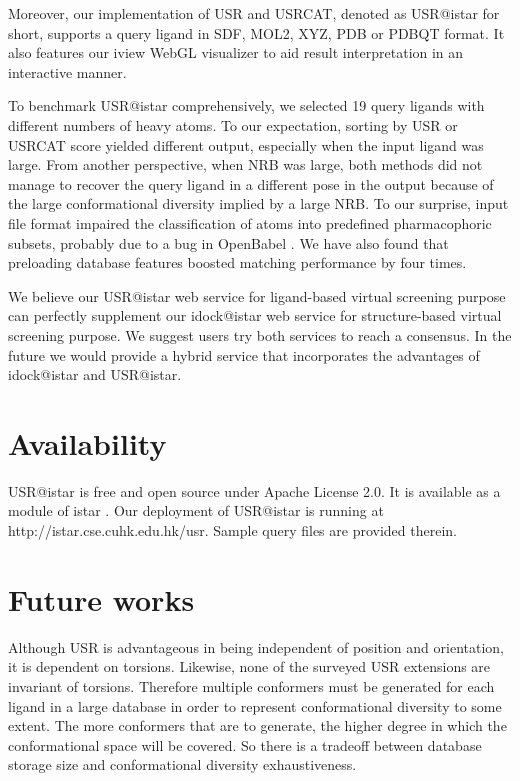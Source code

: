 Moreover, our implementation of USR and USRCAT, denoted as USR@istar for short, supports a query ligand in SDF, MOL2, XYZ, PDB or PDBQT format. It also features our iview \citep{1366} WebGL visualizer to aid result interpretation in an interactive manner.

To benchmark USR@istar comprehensively, we selected 19 query ligands with different numbers of heavy atoms. To our expectation, sorting by USR or USRCAT score yielded different output, especially when the input ligand was large. From another perspective, when NRB was large, both methods did not manage to recover the query ligand in a different pose in the output because of the large conformational diversity implied by a large NRB. To our surprise, input file format impaired the classification of atoms into predefined pharmacophoric subsets, probably due to a bug in OpenBabel \citep{968}. We have also found that preloading database features boosted matching performance by four times.

We believe our USR@istar web service for ligand-based virtual screening purpose can perfectly supplement our idock@istar web service for structure-based virtual screening purpose. We suggest users try both services to reach a consensus. In the future we would provide a hybrid service that incorporates the advantages of idock@istar and USR@istar.

\section{Availability}

USR@istar is free and open source under Apache License 2.0. It is available as a module of istar \citep{1362}. Our deployment of USR@istar is running at http://istar.cse.cuhk.edu.hk/usr. Sample query files are provided therein.

\section{Future works}

Although USR is advantageous in being independent of position and orientation, it is dependent on torsions. Likewise, none of the surveyed USR extensions are invariant of torsions. Therefore multiple conformers must be generated for each ligand in a large database in order to represent conformational diversity to some extent. The more conformers that are to generate, the higher degree in which the conformational space will be covered. So there is a tradeoff between database storage size and conformational diversity exhaustiveness.

